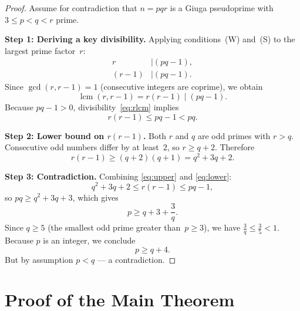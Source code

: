 \documentclass[12pt,a4paper]{amsart}
\theoremstyle{definition}
\DeclareMathOperator{\lcm}{lcm}
\begin{document}
\begin{proof}
Assume for contradiction that $n = pqr$ is a Giuga pseudoprime
with $3 \le p < q < r$ prime.

\medskip
\noindent\textbf{Step 1: Deriving a key divisibility.}
Applying conditions~(W) and~(S) to the largest prime factor~$r$:
\begin{align}
  r &\mid (pq - 1), \label{eq:rW} \\
  (r - 1) &\mid (pq - 1). \label{eq:rS}
\end{align}
Since $\gcd(r, r-1) = 1$ (consecutive integers are coprime), we obtain
\begin{equation}
  \lcm(r, r-1) = r(r-1) \mid (pq - 1).
  \label{eq:rlcm}
\end{equation}
Because $pq - 1 > 0$, divisibility~\eqref{eq:rlcm} implies
\begin{equation}
  r(r - 1) \le pq - 1 < pq.
  \label{eq:upper}
\end{equation}

\medskip
\noindent\textbf{Step 2: Lower bound on $r(r-1)$.}
Both $r$ and $q$ are odd primes with $r > q$.  Consecutive odd numbers differ
by at least~$2$, so $r \ge q + 2$.  Therefore
\begin{equation}
  r(r - 1) \ge (q + 2)(q + 1) = q^2 + 3q + 2.
  \label{eq:lower}
\end{equation}

\medskip
\noindent\textbf{Step 3: Contradiction.}
Combining \eqref{eq:upper} and \eqref{eq:lower}:
\[
  q^2 + 3q + 2 \le r(r-1) \le pq - 1,
\]
so $pq \ge q^2 + 3q + 3$, which gives
\[
  p \ge q + 3 + \frac{3}{q}.
\]
Since $q \ge 5$ (the smallest odd prime greater than~$p \ge 3$), we have
$\tfrac{3}{q} \le \tfrac{3}{5} < 1$.  Because $p$ is an integer, we conclude
\[
  p \ge q + 4.
\]
But by assumption $p < q$ — a contradiction.
\end{proof}

\section{Proof of the Main Theorem}
\end{document}
